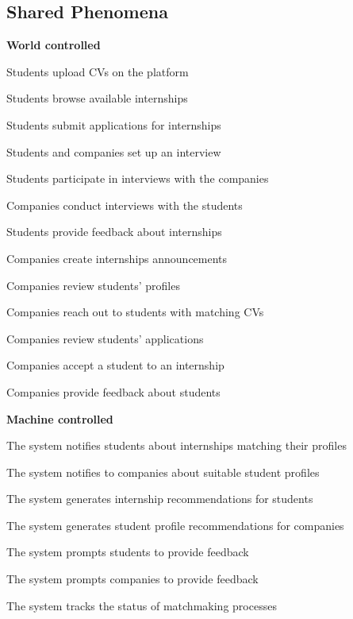 \subsection{Shared Phenomena }
\textbf{World controlled}
\begin{enumerate}[label={[SP\arabic{enumi}]}]
    \item Students upload CVs on the platform
    \item Students browse available internships
    \item Students submit applications for internships
    \item Students and companies set up an interview 
    \item Students participate in interviews with the companies
    \item Companies conduct interviews with the students
    \item Students provide feedback about internships
    \item Companies create internships announcements
    \item Companies review students' profiles
    \item Companies reach out to students with matching CVs
    \item Companies review students' applications
    \item Companies accept a student to an internship
    \item Companies provide feedback about students
\end{enumerate}

\textbf{Machine controlled}
\begin{enumerate}[label={[SP\arabic{enumi}]}]
    \setcounter{enumi}{13} %
    \item The system notifies students about internships matching their profiles
    \item The system notifies to companies about suitable student profiles
    \item The system generates internship recommendations for students
    \item The system generates student profile recommendations for companies
    \item The system prompts students to provide feedback
    \item The system prompts companies to provide feedback
    \item The system tracks the status of matchmaking processes
\end{enumerate}

